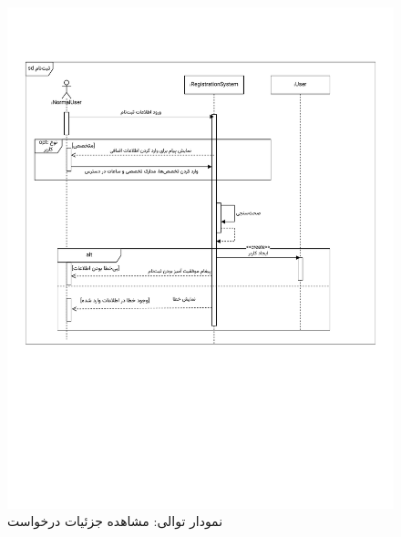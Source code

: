 \begin{figure}[ht!]
	\centering
	\includegraphics[scale=0.8, page=11]{figs/OOD-Sequence-1.pdf}
	\caption{نمودار توالی: مشاهده جزئیات درخواست}
\end{figure}
\FloatBarrier
\newpage

